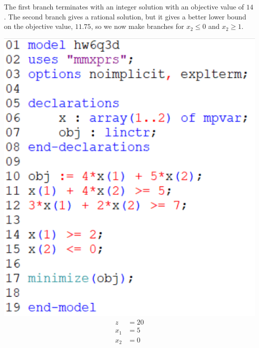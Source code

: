 \documentclass[12pt]{article}
\theoremstyle{definition}
\begin{document}
The first branch terminates with an integer solution with an objective value of $14$. The second branch gives a rational solution, but it gives a better lower bound on the objective value, $11.75$, so we now make branches for $x_2 \leq 0$ and $x_2 \geq 1$.
\begin{center}
    \begin{minipage}{0.4\textwidth}
        \includegraphics[width=\textwidth]{code3d.png}
        \begin{align*}
            z &= 20 \\
            x_1 &= 5 \\
            x_2 &= 0
        \end{align*}
    \end{minipage}
    \begin{minipage}{0.4\textwidth}

\end{minipage}
\end{center}
\end{document}
